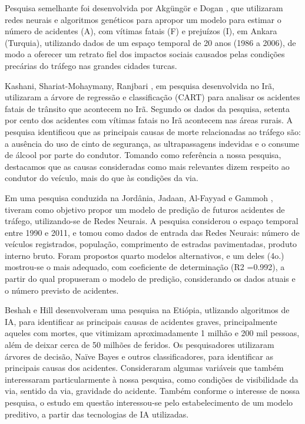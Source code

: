 Pesquisa semelhante foi desenvolvida por Akgüngör e Dogan \cite{akgungor2009artificial}, que utilizaram redes neurais e algoritmos genéticos para apropor um modelo para estimar o número de acidentes (A), com vítimas fatais (F) e prejuízos (I), em Ankara (Turquia), utilizando dados de um espaço temporal de 20 anos (1986 a 2006), de modo a oferecer um retrato fiel dos impactos sociais causados pelas condições precárias do tráfego nas grandes cidades turcas.

Kashani, Shariat-Mohaymany, Ranjbari \cite{tavakoli2011data}, em pesquisa desenvolvida no Irã, utilizaram a árvore de regressão e classificação (CART) para analisar os acidentes fatais de trânsito que acontecem no Irã. Segundo os dados da pesquisa, setenta por cento dos acidentes com vítimas fatais no Irã acontecem nas áreas rurais. A pesquisa identificou que as principais causas de morte relacionadas ao tráfego são: a ausência do uso de cinto de segurança, as ultrapassagens indevidas e o consume de álcool por parte do condutor. Tomando como referência a nossa pesquisa, destacamos que as causas consideradas como mais relevantes dizem respeito ao condutor do veículo, mais do que às condições da via.

Em uma pesquisa conduzida na Jordânia, Jadaan, Al-Fayyad e Gammoh \cite{jadaan2014prediction}, tiveram como objetivo propor um modelo de predição de futuros acidentes de tráfego, utilizando-se de Redes Neurais. A pesquisa considerou o espaço temporal entre 1990 e 2011, e tomou como dados de entrada das Redes Neurais: número de veículos registrados, população, comprimento de estradas pavimentadas, produto interno bruto. Foram propostos quarto modelos alternativos, e um deles (4o.) mostrou-se o mais adequado, com coeficiente de determinação (R2 =0.992), a partir do qual propuseram o modelo de predição, considerando os dados atuais e o número previsto de acidentes.

Beshah e Hill \cite{beshah2010mining} desenvolveram uma pesquisa na Etiópia, utlizando algoritmos de IA, para identificar as principais causas de acidentes graves, principalmente aqueles com mortes, que vitimizam aproximadamente 1 milhão e 200 mil pessoas, além de deixar cerca de 50 milhões de feridos. Os pesquisadores utilizaram árvores de decisão, Naïve Bayes e outros classificadores, para identificar as principais causas dos acidentes. Consideraram algumas variáveis que também interessaram particularmente à nossa pesquisa, como condições de visibilidade da via, sentido da via, gravidade do acidente. Também conforme o interesse de nossa pesquisa, o estudo em questão interessou-se pelo estabelecimento de um modelo preditivo, a partir das tecnologias de IA utilizadas.

